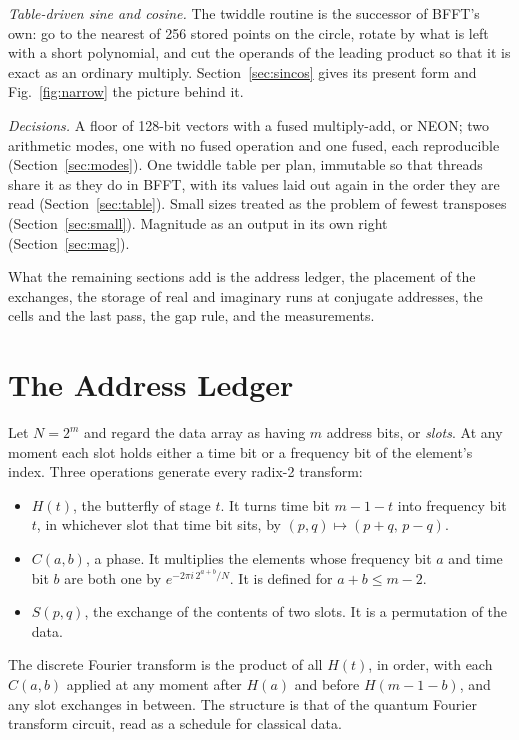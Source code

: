 \documentclass[conference]{IEEEtran}
\begin{document}
\emph{Table-driven sine and cosine.}
The twiddle routine is the successor of BFFT's own: go to the nearest of 256 stored points on the circle, rotate by what is left with a short polynomial, and cut the operands of the leading product so that it is exact as an ordinary multiply.
Section~\ref{sec:sincos} gives its present form and Fig.~\ref{fig:narrow} the picture behind it.

\emph{Decisions.}
A floor of 128-bit vectors with a fused multiply-add, or NEON; two arithmetic modes, one with no fused operation and one fused, each reproducible (Section~\ref{sec:modes}).
One twiddle table per plan, immutable so that threads share it as they do in BFFT, with its values laid out again in the order they are read (Section~\ref{sec:table}).
Small sizes treated as the problem of fewest transposes (Section~\ref{sec:small}).
Magnitude as an output in its own right (Section~\ref{sec:mag}).

What the remaining sections add is the address ledger, the placement of the exchanges, the storage of real and imaginary runs at conjugate addresses, the cells and the last pass, the gap rule, and the measurements.

\section{The Address Ledger}\label{sec:ledger}

Let $N=2^m$ and regard the data array as having $m$ address bits, or \emph{slots}.
At any moment each slot holds either a time bit or a frequency bit of the element's index.
Three operations generate every radix-2 transform:
\begin{itemize}
\item $H(t)$, the butterfly of stage $t$. It turns time bit $m{-}1{-}t$ into frequency bit $t$, in whichever slot that time bit sits, by $(p,q)\mapsto(p+q,\,p-q)$.
\item $C(a,b)$, a phase. It multiplies the elements whose frequency bit $a$ and time bit $b$ are both one by $e^{-2\pi i\,2^{a+b}/N}$. It is defined for $a+b\le m-2$.
\item $S(p,q)$, the exchange of the contents of two slots. It is a permutation of the data.
\end{itemize}
The discrete Fourier transform is the product of all $H(t)$, in order, with each $C(a,b)$ applied at any moment after $H(a)$ and before $H(m{-}1{-}b)$, and any slot exchanges in between.
The structure is that of the quantum Fourier transform circuit, read as a schedule for classical data.
\end{document}
